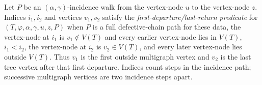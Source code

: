\begin{definition}
Let $P$ be an $(\alpha,\gamma)$-incidence walk from the vertex-node $u$ to
the vertex-node $z$.  Indices $i_1,i_2$ and vertices $v_1,v_2$ satisfy the
\emph{first-departure/last-return predicate} for
$(T,\varphi,\alpha,\gamma,u,z,P)$ when $P$ is a full defective-chain path
for these data, the vertex-node at $i_1$ is $v_1\notin V(T)$ and every
earlier vertex-node lies in $V(T)$, $i_1<i_2$, the vertex-node at $i_2$ is
$v_2\in V(T)$, and every later vertex-node lies outside $V(T)$.  Thus
$v_1$ is the first outside multigraph vertex and $v_2$ is the last tree
vertex after that first departure.  Indices count steps in the incidence
path; successive multigraph vertices are two incidence steps apart.
\end{definition}
